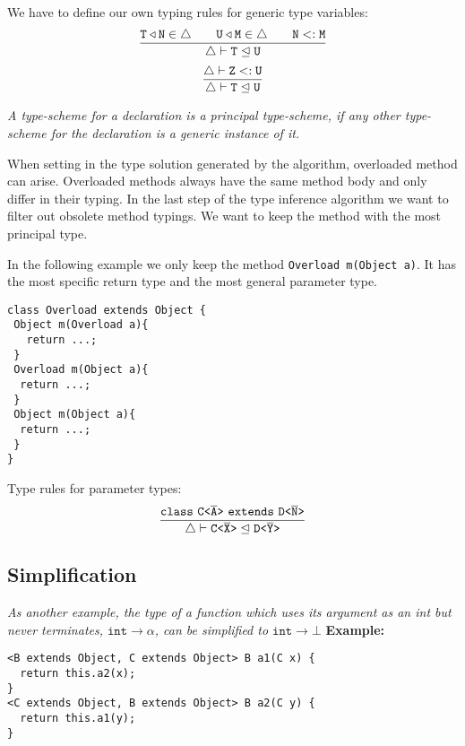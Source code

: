 \documentclass[a4paper,USenglish,cleveref, autoref, thm-restate]{lipics-v2021}
\begin{document}
We have to define our own typing rules for generic type variables:
\begin{align*}
\frac{\displaystyle \mathtt{
  T \triangleleft N \in \triangle \quad \quad U \triangleleft M \in \triangle \quad \quad 
  N <: M
  }
}{\displaystyle \mathtt{\triangle \vdash T \trianglelefteq U}}
\end{align*}
\begin{align*}
\frac{\displaystyle \mathtt{
  \triangle \vdash Z <: U
  }
}{\displaystyle \mathtt{\triangle \vdash T \trianglelefteq U}}
\end{align*}

\emph{A type-scheme for a declaration is a \emph{principal type-scheme}, if any
    other type-scheme for the 
declaration is a generic instance of it.}\cite{DM82}

When setting in the type solution generated by the \unify algorithm,
overloaded method can arise.
Overloaded methods always have the same method body and only differ in their typing.
In the last step of the type inference algorithm we want to filter out obsolete method typings.
We want to keep the method with the most principal type.

In the following example we only keep the method
\texttt{Overload m(Object a)}.
It has the most specific return type and the most general parameter type.
\begin{lstlisting}
class Overload extends Object {
 Object m(Overload a){
   return ...;
 }
 Overload m(Object a){
  return ...;
 }
 Object m(Object a){
  return ...;
 }
}
\end{lstlisting}

Type rules for parameter types:
\begin{align*}
  \ddfrac{\mathtt{    
    \texttt{class}\ \exptype{C}{\ol{A}}\ \texttt{extends}\ \exptype{D}{\ol{N}}
    }
  }{\mathtt{\triangle \vdash \exptype{C}{\ol{X}} \trianglelefteq \exptype{D}{\ol{Y}}}}
\end{align*}




\subsection{Simplification}
\emph{As another example, the type of a function which uses its argument as an int but never terminates,
$\texttt{int} \to \alpha$, can be simplified to $\texttt{int} \to \bot$}
\cite{10.1145/3409006}
\textbf{Example:}
\begin{lstlisting}
<B extends Object, C extends Object> B a1(C x) {
  return this.a2(x);
}
<C extends Object, B extends Object> B a2(C y) {
  return this.a1(y);
}
\end{lstlisting}
\end{document}
